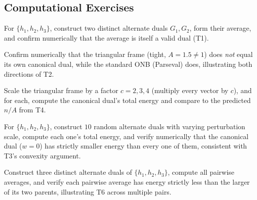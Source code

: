 \subsection*{Computational Exercises}
\begin{compexercises}
	\item For $\{h_1,h_2,h_3\}$, construct two distinct alternate duals
	$G_1,G_2$, form their average, and confirm numerically that the
	average is itself a valid dual (T1).
	
	\item Confirm numerically that the triangular frame (tight, $A=1.5\ne1$)
	does \emph{not} equal its own canonical dual, while the standard
	ONB (Parseval) does, illustrating both directions of T2.
	
	\item Scale the triangular frame by a factor $c=2,3,4$ (multiply every
	vector by $c$), and for each, compute the canonical dual's total
	energy and compare to the predicted $n/A$ from T4.
	
	\item For $\{h_1,h_2,h_3\}$, construct $10$ random alternate duals with
	varying perturbation scale, compute each one's total energy, and
	verify numerically that the canonical dual ($w=0$) has strictly
	smaller energy than every one of them, consistent with T3's
	convexity argument.
	
	\item Construct three distinct alternate duals of $\{h_1,h_2,h_3\}$,
	compute all pairwise averages, and verify each pairwise average
	has energy strictly less than the larger of its two parents,
	illustrating T6 across multiple pairs.
\end{compexercises}